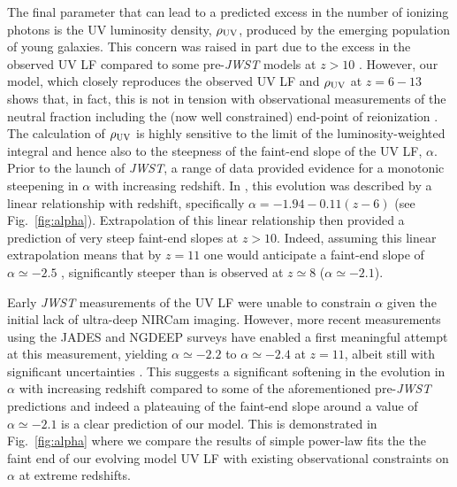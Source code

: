\documentclass[fleqn,usenatbib]{mnras}
\begin{document}
The final parameter that can lead to a predicted excess in the number of ionizing photons is the UV luminosity density, $\rho_{\rm UV}$, produced by the emerging population of young galaxies. This concern was raised in part due to the excess in the observed UV LF compared to some pre-\textit{JWST} models at $z>10$ \citep[e.g.][]{mason2015,yung2019}. However, our model, which closely reproduces the observed UV LF and $\rho_{\rm UV}$ at $z=6-13$ shows that, in fact, this is not in tension with observational measurements of the neutral fraction including the (now well constrained) end-point of reionization \citep[at $z\simeq5.5$;][]{bosman2021}. The calculation of $\rho_{\rm UV}$ is highly sensitive to the limit of the luminosity-weighted integral and hence also to the steepness of the faint-end slope of the UV LF, $\alpha$. Prior to the launch of \textit{JWST}, a range of data provided evidence for a monotonic steepening in $\alpha$ with increasing redshift. In \citet{bouwens2021}, this evolution was described by a linear relationship with redshift, specifically $\alpha = -1.94-0.11(z-6)$ (see Fig.~\ref{fig:alpha}). Extrapolation of this linear relationship then provided a prediction of very steep faint-end slopes at $z>10$. Indeed, assuming this linear extrapolation means that by $z=11$ one would anticipate a faint-end slope of $\alpha\simeq-2.5$ \citep{bouwens2023a}, significantly steeper than is observed at $z\simeq8$ ($\alpha\simeq-2.1$). 

Early \textit{JWST} measurements of the UV LF were unable to constrain $\alpha$ given the initial lack of ultra-deep NIRCam imaging. However, more recent measurements using the JADES \citep{eisenstein2023} and NGDEEP \citep{bagley2024} surveys have enabled a first meaningful attempt at this measurement, yielding $\alpha \simeq -2.2$ to $\alpha \simeq -2.4$ at $z=11$, albeit still with significant uncertainties \citep{leung2023,perezgonzalez2023,donnan2024,whitler2025}. This suggests a significant softening in the evolution in $\alpha$ with increasing redshift compared to some of the aforementioned pre-\textit{JWST} predictions and indeed a plateauing of the faint-end slope around a value of $\alpha \simeq -2.1$ is a clear prediction of our model. This is demonstrated in Fig.~\ref{fig:alpha} where we compare the results of simple power-law fits the the faint end of our evolving model UV LF with existing observational constraints on $\alpha$ at extreme redshifts. 
\end{document}
